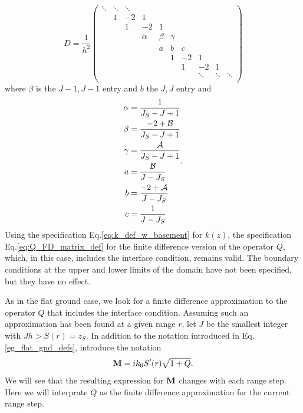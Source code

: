 \begin{equation}\label{eq:Discrete_d^2_flat_interface}
D=
\frac{1}{h^2}\begin{pmatrix}
\ddots&\ddots&\ddots&&&&&&\\
&1&-2&1&&&&&\\
&&1&-2&1&&&&\\
&&&\alpha&\beta&\gamma&&&\\
&&&&a&b&c&&\\
&&&&&1&-2&1&\\
&&&&&&1&-2&1\\
&&&&&&&\ddots&\ddots&\ddots\\
\end{pmatrix}
\end{equation}
where $\beta$ is the $J-1,J-1$ entry and $b$ the $J,J$ entry and 
\[
\begin{aligned}
\alpha &=\frac{1}{J_S-J+1}\\
\beta &=\frac{-2+{\cal B}}{J_S-J+1}\\
\gamma &=\frac{{\cal A}}{J_S-J+1}\\
a &=\frac{{\cal B}}{J-J_S}\\
b &=\frac{-2+{\cal A}}{J-J_S}\\
c &=\frac{1}{J-J_S}\\
\end{aligned}.
\]
Using the specification Eq.\ref{eq:k_def_w_basement} for $k(z)$, the specification Eq.\ref{eq:Q_FD_matrix_def} for the finite difference version of the operator $Q$, which, in this case, includes the interface condition, remains valid. The boundary conditions at the upper and lower limits of the domain have not been specified, but they have no effect. 

As in the flat ground case, we look for a finite difference approximation to the operator $Q$ that includes the interface condition. Assuming such an approximation has been found at a given range $r$, let $J$ be the smallest integer with $Jh>S(r)=z_S$. In addition to the notation introduced in Eq.\ref{eg_flat_gnd_defs}, introduce the notation 
\[
{\bf M}=ik_0S^\prime(r)\sqrt{1+Q}.
\] 
We will see that the resulting expression for ${\bf M}$ changes with each range step. Here we will interprate $Q$ as the finite difference approximation for the current range step. 

